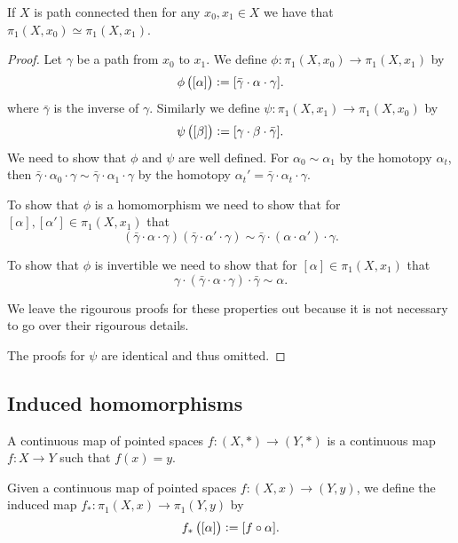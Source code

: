 \documentclass[11pt,a4paper]{article}
\begin{document}
\begin{proposition}
  \label{lem:path-connected-implies-equivalent-fundamental-group}
  If $X$ is path connected then for any $x_0,x_1 \in X$ we have that
  $\pi_1(X,x_0) \simeq \pi_1(X,x_1)$.
\end{proposition}
\begin{proof}
  Let $\gamma$ be a path from $x_0$ to $x_1$.
  We define $\phi \colon \pi_1(X,x_0) \to \pi_1(X,x_1)$ by
  \[
    \phi\del{[\alpha]} := [\bar \gamma \cdot \alpha \cdot \gamma].
  \]
  where $\bar \gamma$ is the inverse of $\gamma$.
  Similarly we define $\psi \colon \pi_1(X,x_1) \to \pi_1(X,x_0)$ by
  \[
    \psi\del{[\beta]} := [\gamma \cdot \beta \cdot \bar \gamma].
  \]
  We need to show that $\phi$ and $\psi$ are well defined.
  For $\alpha_0 \sim \alpha_1$ by the homotopy $\alpha_t$,
  then
  $\bar \gamma \cdot \alpha_0 \cdot \gamma \sim 
  \bar \gamma \cdot \alpha_1 \cdot \gamma$ by the homotopy
  $\alpha_t' = \bar \gamma \cdot \alpha_t \cdot \gamma$.

  To show that $\phi$ is a homomorphism we need to show that
  for $[\alpha], [\alpha'] \in \pi_1(X,x_1)$ that
  \[
    (\bar \gamma \cdot \alpha \cdot \gamma)
    (\bar \gamma \cdot \alpha' \cdot \gamma) \sim
     \bar \gamma \cdot (\alpha \cdot \alpha') \cdot \gamma.
  \]

  To show that $\phi$ is invertible we need to show that for
  $[\alpha] \in \pi_1(X,x_1)$ that
  \[
    \gamma \cdot (\bar \gamma \cdot \alpha \cdot \gamma) \cdot \bar \gamma
  \sim \alpha.
  \]

  We leave the rigourous proofs for these properties out because it is
  not necessary to go over their rigourous details.
  
  The proofs for $\psi$ are identical and thus omitted.
\end{proof}

\subsection{Induced homomorphisms}
\begin{definition}
  A continuous map of pointed spaces $f \colon (X,*) \to (Y,*)$ is
  a continuous map $f \colon X \to Y$ such that $f(x) = y$.
\end{definition}

\begin{definition}
  Given a continuous map of pointed spaces $f \colon (X,x) \to (Y,y)$,
  we define the induced map $f_* \colon \pi_1(X,x) \to \pi_1(Y,y)$
  by
  \[
    f_*\del{[\alpha]} := [f \circ \alpha].
  \]
\end{definition}
\end{document}
